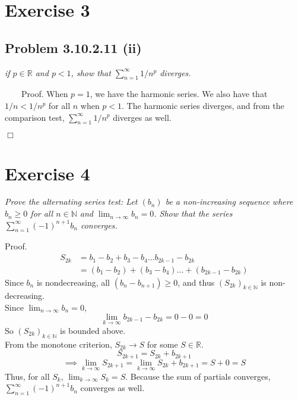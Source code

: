 \documentclass[
]{article}
\begin{document}
\hypertarget{exercise-3}{%
\section{Exercise 3}\label{exercise-3}}

\hypertarget{problem-3.10.2.11-ii}{%
\subsection{Problem 3.10.2.11 (ii)}\label{problem-3.10.2.11-ii}}

\textit{if $p \in \mathbb{R}$ and $p < 1$, show that $\sum ^ \infty _{n = 1} 1/{n^p}$ diverges.}

~~~~Proof. When \(p = 1\), we have the harmonic series. We also have
that \(1/n < 1/n^p\) for all \(n\) when \(p < 1\). The harmonic series
diverges, and from the comparison test,
\(\sum ^ \infty _{n = 1} 1/{n^p}\) diverges as well.

\hfill \(\Box\)

\hypertarget{exercise-4}{%
\section{Exercise 4}\label{exercise-4}}

\textit{Prove the alternating series test: Let $(b_n)$ be a non-increasing sequence where $b_n\geq 0$ for all $n\in\mathbb{N}$ and $\lim _{n\to\infty} b_n = 0$. Show that the series $\sum ^ \infty _{n = 1} (-1)^{n+1}b_n$ converges.}

Proof. \[\begin{aligned} 
S_{2k} &= b_1 - b_2 + b_3 - b_4 ...  b_{2k-1} - b_{2k} \\ 
&= (b_1 - b_2) + (b_3 - b_4) ... + (b_{2k-1} - b_{2k})
\end{aligned}\] Since \(b_n\) is nondecreasing, all
\((b_n - b_{n+1}) \geq 0\), and thus \((S_{2k})_{k\in\mathbb{N}}\) is
non-decreasing.\\
\hspace*{0.333em}\hspace*{0.333em}\hspace*{0.333em}\hspace*{0.333em}Since
\(\lim _{n\to\infty} b_n = 0\),
\[ \lim  _{k\to\infty} b_{2k-1} - b_{2k} = 0 - 0 = 0 \] So
\((S_{2k})_{k\in\mathbb{N}}\) is bounded above.\\
\hspace*{0.333em}\hspace*{0.333em}\hspace*{0.333em}\hspace*{0.333em}From
the monotone criterion, \(S_{2k} \to S\) for some \(S\in\mathbb{R}\).
\[S_{2k+1} = S_{2k} + b_{2 k + 1}\]
\[\implies \lim _{k\to\infty} S_{2k+1} = \lim _{k\to\infty}S_{2k} + b_{2 k + 1} = S + 0 = S\]
Thus, for all \(S_k\), \(\lim _{k\to\infty} S_k = S\). Because the sum
of partials converges, \(\sum ^ \infty _{n = 1} (-1)^{n+1}b_n\)
converges as well.
\end{document}
